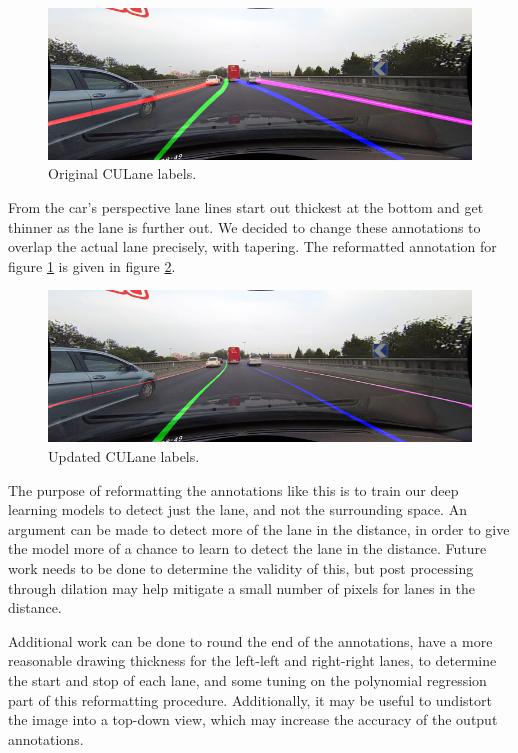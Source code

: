 \documentclass[twoside,twocolumn]{article}
\begin{document}
\begin{figure}
  \includegraphics[width=\linewidth]{calvin3.png}
  \caption{Original CULane labels.}
  \label{fig:og}
\end{figure}

\par From the car's perspective lane lines start out thickest at the bottom and get thinner as the lane is further out. We decided to change these annotations to overlap the actual lane precisely, with tapering. The reformatted annotation for figure \ref{fig:og} is given in figure \ref{fig:updated}.

\begin{figure}
  \includegraphics[width=\linewidth]{calvin4.png}
  \caption{Updated CULane labels.}
  \label{fig:updated}
\end{figure}

\par The purpose of reformatting the annotations like this is to train our deep learning models to detect just the lane, and not the surrounding space. An argument can be made to detect more of the lane in the distance, in order to give the model more of a chance to learn to detect the lane in the distance. Future work needs to be done to determine the validity of this, but post processing through dilation may help mitigate a small number of pixels for lanes in the distance.
\par Additional work can be done to round the end of the annotations, have a more reasonable drawing thickness for the left-left and right-right lanes, to determine the start and stop of each lane, and some tuning on the polynomial regression part of this reformatting procedure. Additionally, it may be useful to undistort the image into a top-down view, which may increase the accuracy of the output annotations.
\end{document}
